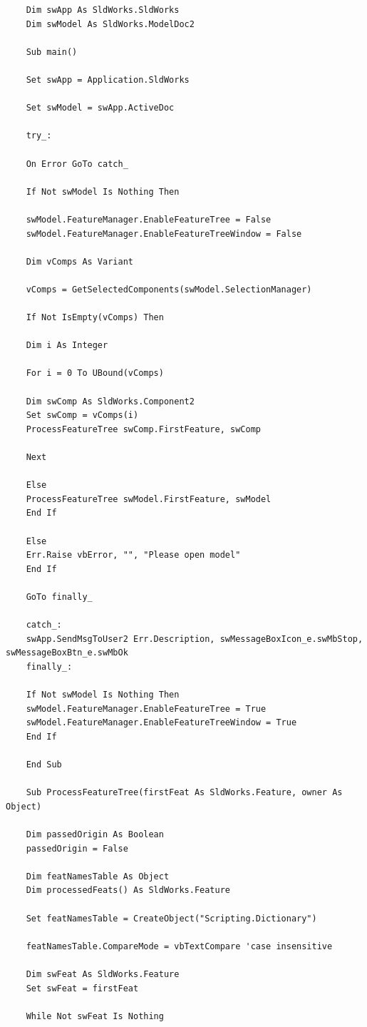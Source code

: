 \documentclass{report}
\begin{document}
\begin{lstlisting}
	Dim swApp As SldWorks.SldWorks
	Dim swModel As SldWorks.ModelDoc2
	
	Sub main()
	
	Set swApp = Application.SldWorks
	
	Set swModel = swApp.ActiveDoc
	
	try_:
	
	On Error GoTo catch_
	
	If Not swModel Is Nothing Then
	
	swModel.FeatureManager.EnableFeatureTree = False
	swModel.FeatureManager.EnableFeatureTreeWindow = False
	
	Dim vComps As Variant
	
	vComps = GetSelectedComponents(swModel.SelectionManager)
	
	If Not IsEmpty(vComps) Then
	
	Dim i As Integer
	
	For i = 0 To UBound(vComps)
	
	Dim swComp As SldWorks.Component2
	Set swComp = vComps(i)
	ProcessFeatureTree swComp.FirstFeature, swComp
	
	Next
	
	Else
	ProcessFeatureTree swModel.FirstFeature, swModel
	End If
	
	Else
	Err.Raise vbError, "", "Please open model"
	End If
	
	GoTo finally_
	
	catch_:
	swApp.SendMsgToUser2 Err.Description, swMessageBoxIcon_e.swMbStop, swMessageBoxBtn_e.swMbOk
	finally_:
	
	If Not swModel Is Nothing Then
	swModel.FeatureManager.EnableFeatureTree = True
	swModel.FeatureManager.EnableFeatureTreeWindow = True
	End If
	
	End Sub
	
	Sub ProcessFeatureTree(firstFeat As SldWorks.Feature, owner As Object)
	
	Dim passedOrigin As Boolean
	passedOrigin = False
	
	Dim featNamesTable As Object
	Dim processedFeats() As SldWorks.Feature
	
	Set featNamesTable = CreateObject("Scripting.Dictionary")
	
	featNamesTable.CompareMode = vbTextCompare 'case insensitive
	
	Dim swFeat As SldWorks.Feature
	Set swFeat = firstFeat
	
	While Not swFeat Is Nothing
	

\end{lstlisting}
\end{document}
